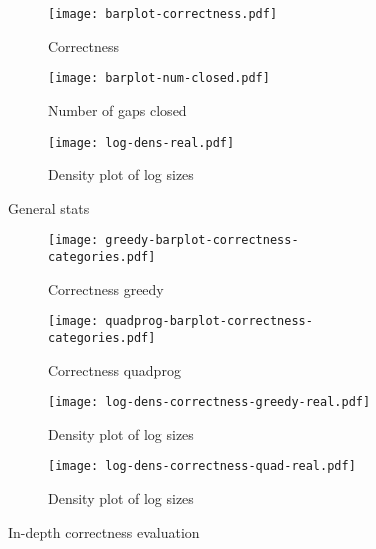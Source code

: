 \documentclass[12pt]{amsart}
\begin{document}

\newpage
\begin{figure}[h!]
  \centering

    \begin{subfigure}{230pt}
    \centering
      \texttt{[image: barplot-correctness.pdf]}
      \caption{Correctness}
    \end{subfigure}%
    \begin{subfigure}{230pt}
      \texttt{[image: barplot-num-closed.pdf]}
      \caption{Number of gaps closed}
    \end{subfigure}

    \begin{subfigure}{400pt}
      \texttt{[image: log-dens-real.pdf]}
      \caption{Density plot of log sizes}
    \end{subfigure}    

  \caption{General stats}
\end{figure}

\begin{figure}[h!]
  \centering

    \begin{subfigure}{230pt}
    \centering
      \texttt{[image: greedy-barplot-correctness-categories.pdf]}
      \caption{Correctness greedy}
    \end{subfigure}%
    \begin{subfigure}{230pt}
      \texttt{[image: quadprog-barplot-correctness-categories.pdf]}
      \caption{Correctness quadprog}
    \end{subfigure}

    \begin{subfigure}{230pt}
      \texttt{[image: log-dens-correctness-greedy-real.pdf]}
      \caption{Density plot of log sizes}
    \end{subfigure}%
    \begin{subfigure}{230pt}
      \texttt{[image: log-dens-correctness-quad-real.pdf]}
      \caption{Density plot of log sizes}
    \end{subfigure}    

  \caption{In-depth correctness evaluation}
\end{figure}
\end{document}
